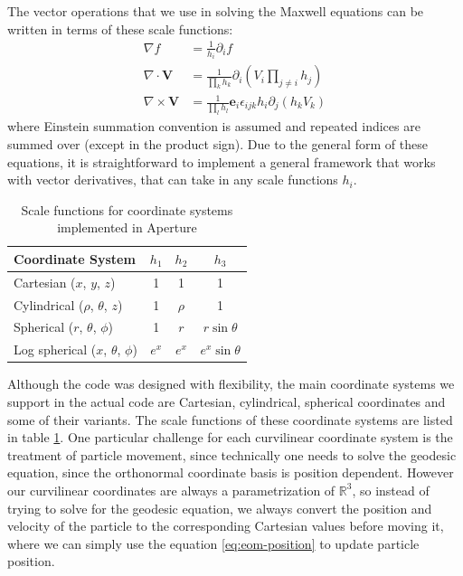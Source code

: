 The vector operations that we use in solving the Maxwell equations can be
written in terms of these scale functions:
\begin{align}
  \label{eq:vector-derivatives}
  \nabla f &= \frac{1}{h_{i}}\partial_{i}f \\
  \nabla \cdot \mathbf{V} &= \frac{1}{\prod_{k}h_{k}}\partial_i(V_i\prod_{j\neq i}h_{j}) \\
  \nabla \times \mathbf{V} &= \frac{1}{\prod_lh_l}\mathbf{e}_{i}\epsilon_{ijk}h_i\partial_j(h_kV_k)
\end{align}
where Einstein summation convention is assumed and repeated indices are summed
over (except in the product sign). Due to the general form of these equations,
it is straightforward to implement a general framework that works with vector
derivatives, that can take in any scale functions $h_{i}$.

\begin{table}[h]
  \centering
  \begin{tabular}{lccc}
    \hline
    Coordinate System & $h_1$ & $h_2$ & $h_3$ \\ \hline
    Cartesian ($x$, $y$, $z$) & 1 & 1 & 1 \\ \hline
    Cylindrical ($\rho$, $\theta$, $z$) & 1 & $\rho$ & 1 \\ \hline
    Spherical ($r$, $\theta$, $\phi$) & 1 & $r$ & $r\sin\theta$ \\ \hline
    Log spherical ($x$, $\theta$, $\phi$) & $e^x$ & $e^{x}$ & $e^x\sin\theta$ \\ \hline
  \end{tabular}
  \caption{Scale functions for coordinate systems implemented in Aperture}
  \label{tab:scale-functions}
\end{table}

Although the code was designed with flexibility, the main coordinate systems we
support in the actual code are Cartesian, cylindrical, spherical coordinates and
some of their variants. The scale functions of these coordinate systems are
listed in table \ref{tab:scale-functions}. One particular challenge for each
curvilinear coordinate system is the treatment of particle movement, since
technically one needs to solve the geodesic equation, since the orthonormal
coordinate basis is position dependent. However our curvilinear coordinates are
always a parametrization of $\mathbb{R}^{3}$, so instead of trying to solve for
the geodesic equation, we always convert the position and velocity of the
particle to the corresponding Cartesian values before moving it, where we can
simply use the equation \eqref{eq:eom-position} to update particle position.

